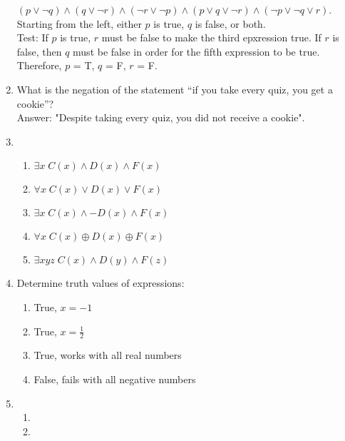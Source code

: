 \documentclass{article}
\begin{document}
\begin{enumerate}
        $(p \lor \lnot q) \land (q \lor \lnot r) \land (\lnot r \lor \lnot p) \land (p \lor q \lor \lnot r) \land (\lnot p \lor \lnot q \lor r)$. \\
        Starting from the left, either $p$ is true, $q$ is false, or both. \\
        Test: If $p$ is true, $r$ must be false to make the third epxression true. If $r$ is false, then $q$ must be false in order for the fifth expression to be true. Therefore, $p$ = T, $q$ = F, $r$ = F. \\
    \item What is the negation of the statement “if you take every quiz, you get a cookie”? \\
        Answer: "Despite taking every quiz, you did not receive a cookie". \\
    \item
        \begin{enumerate}
            \item $\exists x\; C(x) \land D(x) \land F(x)$
            \item $\forall x\; C(x) \lor D(x) \lor F(x)$
            \item $\exists x\; C(x) \land -D(x) \land F(x)$
            \item $\forall x\; C(x) \oplus D(x) \oplus F(x)$
            \item $\exists xyz\; C(x) \land D(y) \land F(z)$
        \end{enumerate}
    \item Determine truth values of expressions:
        \begin{enumerate}
            \item True, $x=-1$
            \item True, $x=\frac{1}{2}$
            \item True, works with all real numbers
            \item False, fails with all negative numbers
        \end{enumerate}
    \item
        \begin{enumerate}
            \item 
            \item
        \end{enumerate}
\end{enumerate}
\end{document}
